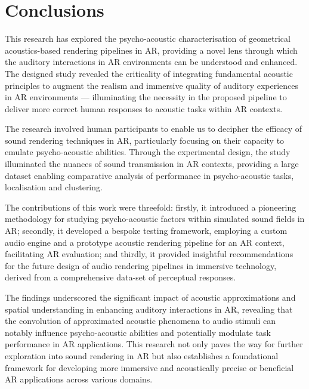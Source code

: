 \section{Conclusions}
This research has explored the psycho-acoustic characterisation of geometrical acoustics-based rendering pipelines in AR, providing a novel lens through which the auditory interactions in AR environments can be understood and enhanced. The designed study revealed the criticality of integrating fundamental acoustic principles to augment the realism and immersive quality of auditory experiences in AR environments --- illuminating the necessity in the proposed pipeline to deliver more correct human responses to acoustic tasks within AR contexts. \par
The research involved human participants to enable us to decipher the efficacy of sound rendering techniques in AR, particularly focusing on their capacity to emulate psycho-acoustic abilities. Through the experimental design, the study illuminated the nuances of sound transmission in AR contexts, providing a large dataset enabling comparative analysis of performance in psycho-acoustic tasks, localisation and clustering. \par
The contributions of this work were threefold: firstly, it introduced a pioneering methodology for studying psycho-acoustic factors within simulated sound fields in AR; secondly, it developed a bespoke testing framework, employing a custom audio engine and a prototype acoustic rendering pipeline for an AR context, facilitating AR evaluation; and thirdly, it provided insightful recommendations for the future design of audio rendering pipelines in immersive technology, derived from a comprehensive data-set of perceptual responses. \par
The findings underscored the significant impact of acoustic approximations and spatial understanding in enhancing auditory interactions in AR, revealing that the convolution of approximated acoustic phenomena to audio stimuli can notably influence psycho-acoustic abilities and potentially modulate task performance in AR applications. This research not only paves the way for further exploration into sound rendering in AR but also establishes a foundational framework for developing more immersive and acoustically precise or beneficial AR applications across various domains. \par
